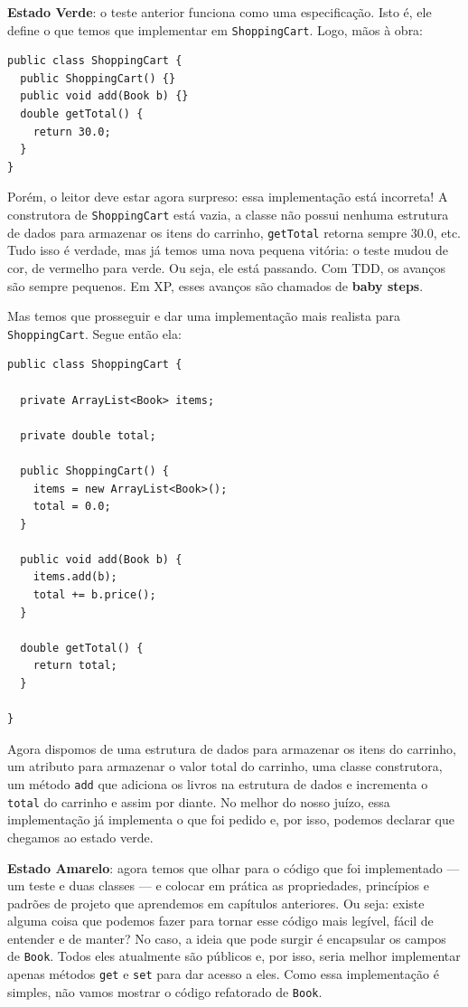 \documentclass[
  11pt,
  twoside]{book}
\newcommand{\passthrough}[1]{#1}
\begin{document}
\textbf{Estado Verde}: o teste anterior funciona como uma especificação.
Isto é, ele define o que temos que implementar em
\passthrough{\lstinline!ShoppingCart!}. Logo, mãos à obra:

\begin{lstlisting}
public class ShoppingCart {
  public ShoppingCart() {}
  public void add(Book b) {}
  double getTotal() {
    return 30.0;
  }
}
\end{lstlisting}

Porém, o leitor deve estar agora surpreso: essa implementação está
incorreta! A construtora de \passthrough{\lstinline!ShoppingCart!} está
vazia, a classe não possui nenhuma estrutura de dados para armazenar os
itens do carrinho, \passthrough{\lstinline!getTotal!} retorna sempre
30.0, etc. Tudo isso é verdade, mas já temos uma nova pequena vitória: o
teste mudou de cor, de vermelho para verde. Ou seja, ele está passando.
Com TDD, os avanços são sempre pequenos. Em XP, esses avanços são
chamados de \textbf{baby steps}.

Mas temos que prosseguir e dar uma implementação mais realista para
\passthrough{\lstinline!ShoppingCart!}. Segue então ela:

\begin{lstlisting}
public class ShoppingCart {

  private ArrayList<Book> items;

  private double total;

  public ShoppingCart() {
    items = new ArrayList<Book>();  
    total = 0.0;  
  }

  public void add(Book b) {
    items.add(b);
    total += b.price();
  }

  double getTotal() {
    return total;
  }

}
\end{lstlisting}

Agora dispomos de uma estrutura de dados para armazenar os itens do
carrinho, um atributo para armazenar o valor total do carrinho, uma
classe construtora, um método \passthrough{\lstinline!add!} que adiciona
os livros na estrutura de dados e incrementa o
\passthrough{\lstinline!total!} do carrinho e assim por diante. No
melhor do nosso juízo, essa implementação já implementa o que foi pedido
e, por isso, podemos declarar que chegamos ao estado verde.

\textbf{Estado Amarelo}: agora temos que olhar para o código que foi
implementado --- um teste e duas classes --- e colocar em prática as
propriedades, princípios e padrões de projeto que aprendemos em
capítulos anteriores. Ou seja: existe alguma coisa que podemos fazer
para tornar esse código mais legível, fácil de entender e de manter? No
caso, a ideia que pode surgir é encapsular os campos de
\passthrough{\lstinline!Book!}. Todos eles atualmente são públicos e,
por isso, seria melhor implementar apenas métodos
\passthrough{\lstinline!get!} e \passthrough{\lstinline!set!} para dar
acesso a eles. Como essa implementação é simples, não vamos mostrar o
código refatorado de \passthrough{\lstinline!Book!}.
\end{document}
